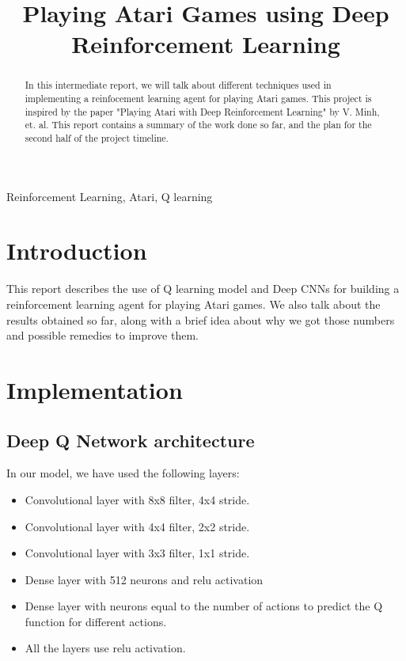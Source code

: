 \documentclass[conference]{IEEEtran}
\begin{document}
\title{Playing Atari Games using Deep Reinforcement Learning\\}

\author{
\and
{}
}

\maketitle

\begin{abstract}
In this intermediate report, we will talk about different techniques used in implementing a reinfocement learning agent for playing Atari games. This project is inspired by the paper "Playing Atari with Deep Reinforcement Learning" by V. Minh, et. al. This report contains a summary of the work done so far, and the plan for the second half of the project timeline. 
\end{abstract}

\begin{IEEEkeywords}
Reinforcement Learning, Atari, Q learning
\end{IEEEkeywords}

\section{Introduction}
This report describes the use of Q learning model and Deep CNNs for building a reinforcement learning agent for playing Atari games. We also talk about the results obtained so far, along with a brief idea about why we got those numbers and possible remedies to improve them. 

\section{Implementation} 
\subsection{Deep Q Network architecture}
In our model, we have used the following layers:
\begin{itemize}
\item Convolutional layer with 8x8 filter, 4x4 stride.
\item Convolutional layer with 4x4 filter, 2x2 stride.
\item Convolutional layer with 3x3 filter, 1x1 stride.
\item Dense layer with 512 neurons and relu activation
\item Dense layer with neurons equal to the number of actions to predict the Q function for different actions.
\item All the layers use relu activation. 
\end{itemize}
\end{document}
